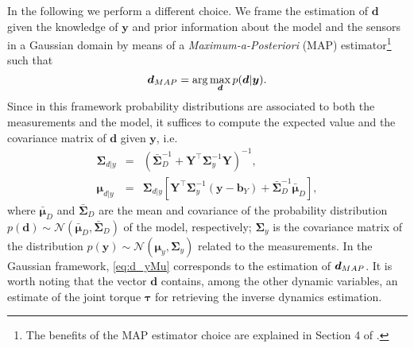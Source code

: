  In the following we perform a different choice.  
  We frame the estimation of $\bm d$ given the knowledge of $\bm y$ and prior information 
  about the model and the sensors in a Gaussian domain by
   means of a \emph{Maximum-a-Posteriori} (MAP) estimator\footnote{The benefits of the MAP
    estimator choice are explained in Section 4 of \cite{LatellaSensors2016}.} such that
%
\begin{equation*} 
\bm d_{\mbox\footnotesize{MAP}}=\arg \max_{\bm d} p(\bm d| \bm y) .
\end{equation*}
Since in this framework probability distributions are associated to both the measurements
 and the model, it suffices to
 compute the expected value and the covariance matrix of $\bm d$ given $\bm y$, i.e.
%
\begin{subequations}\label{eq:d_y} 
	\begin{eqnarray}\label{eq:d_ySigma} 
	 \bm {\Sigma}_{d|y}& = & \left(\bar{\bm {\Sigma}}_D^{-1}+ \bm Y^\top \bm 
	 {\Sigma}_{y}^{-1} \bm Y \right)^{-1},\\ \label{eq:d_yMu} 
	 \bm {\mu}_{d|y} &= & \bm {\Sigma}_{d|y} \left[ \bm Y ^\top \bm {\Sigma}_{y}^{-1} 
	 (\bm y - \bm b_Y) + \bar{\bm {\Sigma}}_D^{-1} \bar {\bm {\mu}}_D \right],
    \end{eqnarray} 
\end{subequations}
%
where $\bar{\bm {\mu}}_D$ and $\bar{\bm {\Sigma}}_D$ are the mean and 
covariance of the probability distribution 
 ${p(\bm d) \sim \mathcal N \left(\bar  
{\bm {\mu}}_D, \bar {\bm {\Sigma}}_D\right)}$ of the model, respectively;
 $\bm {\Sigma}_{y}$ is the covariance 
matrix of the distribution ${p(\bm y)\sim\mathcal N \left({\bm {\mu}}_y, {\bm {\Sigma}}_y\right)}$ related to the measurements.
  In the Gaussian framework, \eqref{eq:d_yMu} 
corresponds to the estimation of $\bm d_{\mbox\footnotesize{MAP}}$.  
It is worth noting that the vector $\bm d$ contains, among the other dynamic variables, an estimate of the joint torque $\bm \tau$ for retrieving the inverse dynamics estimation.